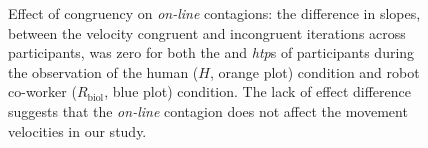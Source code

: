\begin{figure}[t]
	\caption{Effect of congruency on \textit{on-line} contagions: the difference in slopes, between the velocity congruent and incongruent iterations across participants, was zero for both the  and \textit{htp}s of participants during the observation of the human ($\textit{H}$, orange plot) condition and robot co-worker ($\textit{R}_{\text{biol}}$, blue plot) condition. The lack of effect difference suggests that the \textit{on-line} contagion does not affect the movement velocities in our study.}
	\label{fig:cong}
\end{figure}

